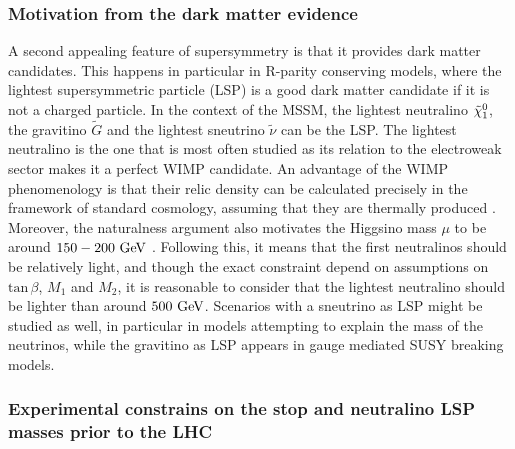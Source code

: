     \subsubsection{Motivation from the dark matter evidence}

    A second appealing feature of supersymmetry is that it provides dark matter
    candidates. This happens in particular in R-parity conserving models, where
    the lightest supersymmetric particle (LSP) is a good dark matter candidate
    if it is not a charged particle. In the context of the MSSM, the lightest
    neutralino $\tilde{\chi}_1^0$, the gravitino $\tilde{G}$ and the lightest
    sneutrino $\tilde{\nu}$ can be the LSP. The lightest neutralino is the one
    that is most often studied as its relation to the electroweak sector makes
    it a perfect WIMP candidate.  An advantage of the WIMP phenomenology is that
    their relic density can be calculated precisely in the framework of standard
    cosmology, assuming that they are thermally produced \cite{EllisDarkMatter}.
    Moreover, the naturalness argument also motivates the Higgsino mass $\mu$ to
    be around $150-200~\text{GeV}$ \cite{NaturalSUSYAndDarkMatter}. Following this, it
    means that the first neutralinos should be relatively light, and though the
    exact constraint depend on assumptions on $\text{tan}\, \beta$, $M_1$ and
    $M_2$, it is reasonable to consider that the lightest neutralino should be
    lighter than around $500~\text{GeV}$.  Scenarios with a sneutrino as LSP might be
    studied as well, in particular in models attempting to explain the mass of
    the neutrinos, while the gravitino as LSP appears in gauge mediated SUSY
    breaking models.

    \subsubsection{Experimental constrains on the stop and neutralino LSP masses prior to
    the LHC}

